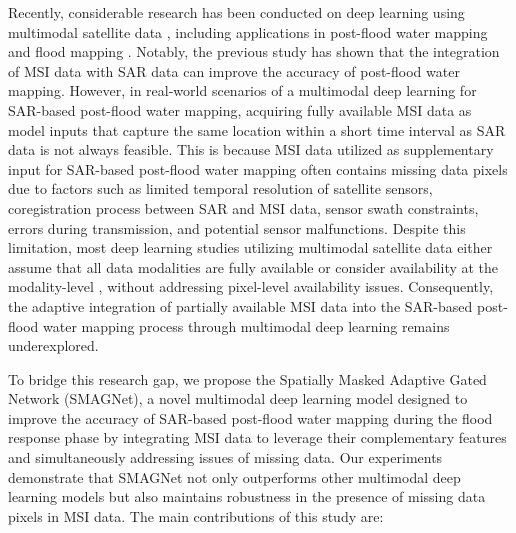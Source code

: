 \documentclass[preprint,12pt,authoryear]{elsarticle}
\begin{document}
Recently, considerable research has been conducted on deep learning using multimodal satellite data \citep{hosseinpour2022cmgfnet, li2022mcanet, liu2024review, ma2024multilevel, mena2024common, sun2021deep, yu2024cmfpnet, zhao2022multi}, including applications in post-flood water mapping and flood mapping \citep{drakonakis2022ombrianet, he2023cross, konapala2021exploring, sanderson2023optimal}. Notably, the previous study \citep{konapala2021exploring} has shown that the integration of MSI data with SAR data can improve the accuracy of post-flood water mapping. However, in real-world scenarios of a multimodal deep learning for SAR-based post-flood water mapping, acquiring fully available MSI data as model inputs that capture the same location within a short time interval as SAR data is not always feasible. This is because MSI data utilized as supplementary input for SAR-based post-flood water mapping often contains missing data pixels due to factors such as limited temporal resolution of satellite sensors, coregistration process between SAR and MSI data, sensor swath constraints, errors during transmission, and potential sensor malfunctions. Despite this limitation, most deep learning studies utilizing multimodal satellite data either assume that all data modalities are fully available \citep{hosseinpour2022cmgfnet, liu2024review, mena2024common} or consider availability at the modality-level \citep{adriano2021learning, kampffmeyer2018urban, li2021dynamic, liu2024multimodal, wei2023msh}, without addressing pixel-level availability issues. Consequently, the adaptive integration of partially available MSI data into the SAR-based post-flood water mapping process through multimodal deep learning remains underexplored. 

To bridge this research gap, we propose the Spatially Masked Adaptive Gated Network (SMAGNet), a novel multimodal deep learning model designed to improve the accuracy of SAR-based post-flood water mapping during the flood response phase by integrating MSI data to leverage their complementary features and simultaneously addressing issues of missing data. Our experiments demonstrate that SMAGNet not only outperforms other multimodal deep learning models but also maintains robustness in the presence of missing data pixels in MSI data. The main contributions of this study are:
\end{document}
